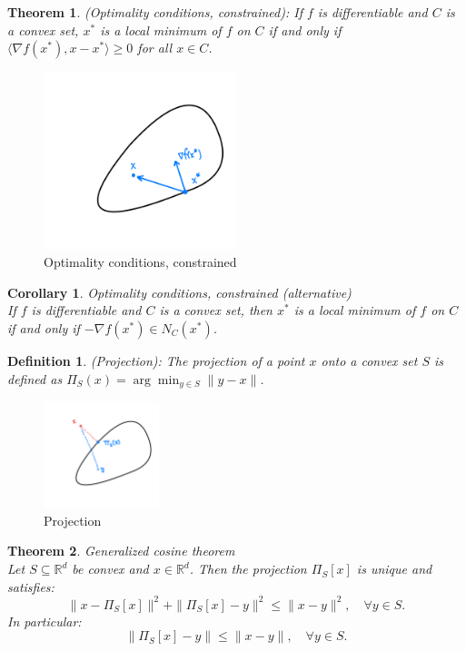 \documentclass[11pt]{book} %
\newtheorem{theorem}{Theorem}[section]
\newtheorem{definition}{Definition}[section]
\newtheorem{corollary}{Corollary}[section]
\begin{document}
\begin{theorem} (Optimality conditions, constrained): If $f$ is differentiable and $C$ is a convex set,
     $x^*$ is a local minimum of $f$ on $C$ if and only if $\langle \nabla f(x^*), x - x^* \rangle \geq 0$ for all $x \in C$.
\end{theorem}

\begin{figure}[H]
    \centering
    \includegraphics[width=0.5\textwidth]{Figs/optimality_condition_constrained.png}
    \caption{Optimality conditions, constrained}
\end{figure}


\begin{corollary}{Optimality conditions, constrained (alternative)} \\
If $f$ is differentiable and $C$ is a convex set, then $x^*$ is a local minimum of $f$ on $C$ if and only if $-\nabla f(x^*) \in N_C(x^*)$.
\end{corollary}

\begin{definition} (Projection): The projection of a point $x$ onto a convex set $S$ is defined as $\Pi_S(x) = \arg\min_{y \in S} \|y-x\|$.
\end{definition}

\begin{figure}[H]
    \centering
    \includegraphics[width=0.3\textwidth]{Figs/projection.png}
    \caption{Projection}
\end{figure}


\begin{theorem} {Generalized cosine theorem} \\
    Let \( S \subseteq \mathbb{R}^d \) be convex and \( x \in \mathbb{R}^d \). Then the projection \( \Pi_S[x] \) is unique and satisfies:
    \begin{equation}
    \| x - \Pi_S[x] \|^2 + \| \Pi_S[x] - y \|^2 \leq \| x - y \|^2, \quad \forall y \in S.
    \end{equation}
    In particular:
    \begin{equation}
    \| \Pi_S[x] - y \| \leq \| x - y \|, \quad \forall y \in S.
    \end{equation}
\end{theorem}
\end{document}
